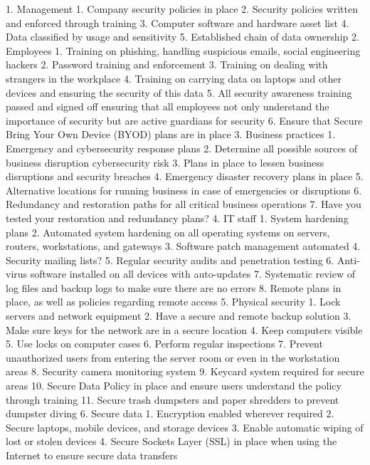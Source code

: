 		1. Management
		1. Company security policies in place
		2. Security policies written and enforced through training
		3. Computer software and hardware asset list
		4. Data classified by usage and sensitivity
		5. Established chain of data ownership
		2. Employees
		1. Training on phishing, handling suspicious emails, social engineering hackers
		2. Password training and enforcement
		3. Training on dealing with strangers in the workplace
		4. Training on carrying data on laptops and other devices and ensuring the security
		of this data
		5. All security awareness training passed and signed off ensuring that all employees
		not only understand the importance of security but are active guardians for
		security
		6. Ensure that Secure Bring Your Own Device (BYOD) plans are in place
		3. Business practices
		1. Emergency and cybersecurity response plans
		2. Determine all possible sources of business disruption cybersecurity risk
		3. Plans in place to lessen business disruptions and security breaches
		4. Emergency disaster recovery plans in place
		5. Alternative locations for running business in case of emergencies or disruptions
		6. Redundancy and restoration paths for all critical business operations
		7. Have you tested your restoration and redundancy plans?
		4. IT staff
		1. System hardening plans
		2. Automated system hardening on all operating systems on servers, routers,
		workstations, and gateways
		3. Software patch management automated
		4. Security mailing lists?
		5. Regular security audits and penetration testing
		6. Anti-virus software installed on all devices with auto-updates
		7. Systematic review of log files and backup logs to make sure there are no errors
		8. Remote plans in place, as well as policies regarding remote access
		5. Physical security
		1. Lock servers and network equipment
		2. Have a secure and remote backup solution
		3. Make sure keys for the network are in a secure location
		4. Keep computers visible
		5. Use locks on computer cases
		6. Perform regular inspections
		7. Prevent unauthorized users from entering the server room or even in the
		workstation areas
		8. Security camera monitoring system
		9. Keycard system required for secure areas
		10. Secure Data Policy in place and ensure users understand the policy through
		training
		11. Secure trash dumpsters and paper shredders to prevent dumpster diving
		6. Secure data
		1. Encryption enabled wherever required
		2. Secure laptops, mobile devices, and storage devices
		3. Enable automatic wiping of lost or stolen devices
		4. Secure Sockets Layer (SSL) in place when using the Internet to ensure secure
		data transfers
		
